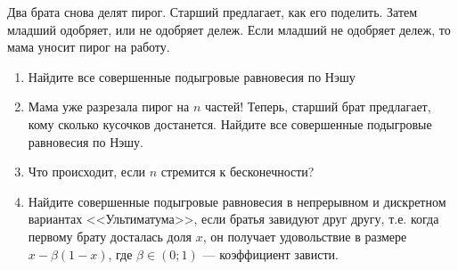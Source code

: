 \begin{problem}[Ультиматум {[О]}]
Два брата снова делят пирог. Старший предлагает, как его поделить. Затем младший одобряет, или не одобряет дележ. Если младший не одобряет дележ, то мама уносит пирог на работу.\par
\begin{enumerate}
\item Найдите все совершенные подыгровые равновесия по Нэшу\par
\item Мама уже разрезала пирог на  $n$  частей! Теперь, старший брат предлагает, кому сколько кусочков достанется. Найдите все совершенные подыгровые равновесия по Нэшу.\par
\item  Что происходит, если  $n$  стремится к бесконечности?\par
\item Найдите совершенные подыгровые равновесия в непрерывном и дискретном вариантах <<Ультиматума>>, если братья завидуют друг другу, т.е. когда первому брату досталась доля  $x$, он получает удовольствие в размере  $x-\beta \left(1-x\right)$, где  $\beta \in \left(0;1\right)$  --- коэффициент зависти.
\end{enumerate}


\begin{sol}

\end{sol}
\end{problem}




